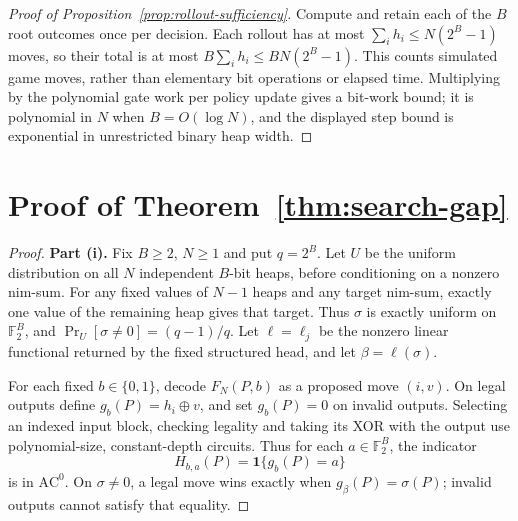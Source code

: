 \documentclass[11pt]{article}
\newcommand{\AC}{\mathrm{AC}}
\theoremstyle{plain}
\theoremstyle{definition}
\theoremstyle{remark}
\numberwithin{equation}{section}
\begin{document}
\begin{proof}[Proof of Proposition~\ref{prop:rollout-sufficiency}]
Compute and retain each of the $B$ root outcomes once per decision. Each rollout has at most $\sum_i h_i\le N(2^B-1)$ moves, so their total is at most $B\sum_i h_i\le BN(2^B-1)$. This counts simulated game moves, rather than elementary bit operations or elapsed time. Multiplying by the polynomial gate work per policy update gives a bit-work bound; it is polynomial in $N$ when $B=O(\log N)$, and the displayed step bound is exponential in unrestricted binary heap width.
\end{proof}

\section{Proof of Theorem~\ref{thm:search-gap}}
\label{app:search-gap-proof}

\begin{proof}
\textbf{Part (i).} Fix $B\ge2$, $N\ge1$ and put $q=2^B$. Let $U$ be the uniform distribution on all $N$ independent $B$-bit heaps, before conditioning on a nonzero nim-sum. For any fixed values of $N-1$ heaps and any target nim-sum, exactly one value of the remaining heap gives that target. Thus $\sigma$ is exactly uniform on $\mathbb F_2^B$, and $\Pr_U[\sigma\ne0]=(q-1)/q$.
Let $\ell=\ell_j$ be the nonzero linear functional returned by the fixed structured head, and let $\beta=\ell(\sigma)$.

For each fixed $b\in\{0,1\}$, decode $F_N(P,b)$ as a proposed move $(i,v)$. On legal outputs define $g_b(P)=h_i\oplus v$, and set $g_b(P)=0$ on invalid outputs. Selecting an indexed input block, checking legality and taking its XOR with the output use polynomial-size, constant-depth circuits. Thus for each $a\in\mathbb F_2^B$, the indicator
\[
H_{b,a}(P)=\mathbf1\{g_b(P)=a\}
\]
is in $\AC^0$. On $\sigma\ne0$, a legal move wins exactly when $g_\beta(P)=\sigma(P)$; invalid outputs cannot satisfy that equality.


\end{proof}
\end{document}
